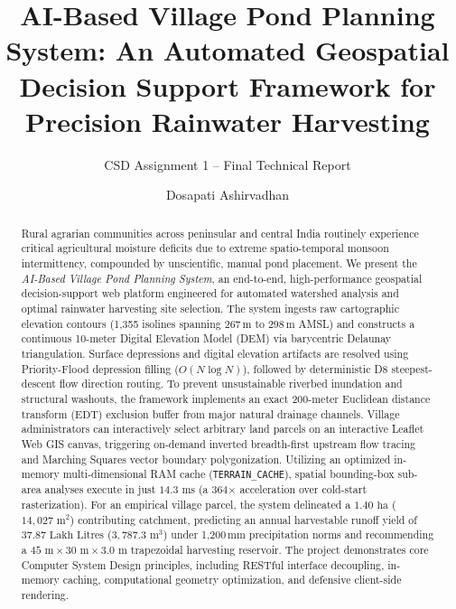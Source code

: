 \documentclass[manuscript,screen,review]{acmart}
\begin{document}
\title{AI-Based Village Pond Planning System: An Automated Geospatial Decision Support Framework for Precision Rainwater Harvesting}
\subtitle{CSD Assignment 1 -- Final Technical Report}

\author{Dosapati Ashirvadhan}

\renewcommand{\shortauthors}{D. Ashirvadhan}

\begin{abstract}
Rural agrarian communities across peninsular and central India routinely experience critical agricultural moisture deficits due to extreme spatio-temporal monsoon intermittency, compounded by unscientific, manual pond placement. We present the \emph{AI-Based Village Pond Planning System}, an end-to-end, high-performance geospatial decision-support web platform engineered for automated watershed analysis and optimal rainwater harvesting site selection. The system ingests raw cartographic elevation contours (1,355 isolines spanning 267\,m to 298\,m AMSL) and constructs a continuous 10-meter Digital Elevation Model (DEM) via barycentric Delaunay triangulation. Surface depressions and digital elevation artifacts are resolved using Priority-Flood depression filling ($O(N \log N)$), followed by deterministic D8 steepest-descent flow direction routing. To prevent unsustainable riverbed inundation and structural washouts, the framework implements an exact 200-meter Euclidean distance transform ($\text{EDT}$) exclusion buffer from major natural drainage channels. Village administrators can interactively select arbitrary land parcels on an interactive Leaflet Web GIS canvas, triggering on-demand inverted breadth-first upstream flow tracing and Marching Squares vector boundary polygonization. Utilizing an optimized in-memory multi-dimensional RAM cache (\texttt{TERRAIN\_CACHE}), spatial bounding-box sub-area analyses execute in just $14.3\text{ ms}$ (a 364$\times$ acceleration over cold-start rasterization). For an empirical village parcel, the system delineated a $1.40\text{ ha}$ ($14,027\text{ m}^2$) contributing catchment, predicting an annual harvestable runoff yield of $37.87\text{ Lakh Litres}$ ($3,787.3\text{ m}^3$) under 1,200\,mm precipitation norms and recommending a $45\text{ m} \times 30\text{ m} \times 3.0\text{ m}$ trapezoidal harvesting reservoir. The project demonstrates core Computer System Design principles, including RESTful interface decoupling, in-memory caching, computational geometry optimization, and defensive client-side rendering.
\end{abstract}
\end{document}
